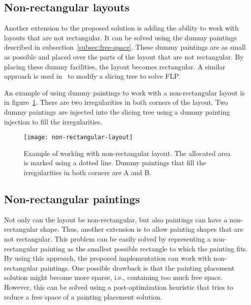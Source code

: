 \subsection{Non-rectangular layouts}\label{subsec:non-rectangular-layouts}

Another extension to the proposed solution is adding the ability to work with layouts that are not rectangular.
It can be solved using the dummy paintings described in subsection~\ref{subsec:free-space}.
These dummy paintings are as small as possible and placed over the parts of the layout that are not rectangular.
By placing these dummy facilities, the layout becomes rectangular.
A similar approach is used in~\cite{scholzExtensionsSTaTSPractical2010} to modify a slicing tree to solve FLP.

An example of using dummy paintings to work with a non-rectangular layout is in figure~\ref{fig:non-rectangular-layout}.
There are two irregularities in both corners of the layout.
Two dummy paintings are injected into the slicing tree using a dummy painting injection to fill the irregularities.

\begin{figure}[h!]
    \texttt{[image: non-rectangular-layout]}
    \caption[Example of working with non-rectangular layout.]{Example of working with non-rectangular layout. The allocated area is marked using a dotted line.
    Dummy paintings that fill the irregularities in both corners are A and B.}
    \label{fig:non-rectangular-layout}
\end{figure}

\subsection{Non-rectangular paintings}\label{subsec:non-rectangular-paintings}

Not only can the layout be non-rectangular, but also paintings can have a non-rectangular shape.
Thus, another extension is to allow painting shapes that are not rectangular.
This problem can be easily solved by representing a non-rectangular painting
as the smallest possible rectangle to which the painting fits.
By using this approach, the proposed implementation can work with non-rectangular paintings.
One possible drawback is that the painting placement solution might become more sparse,
i.e., containing too much free space.
However, this can be solved using a post-optimization heuristic that tries to reduce a free space
of a painting placement solution.

